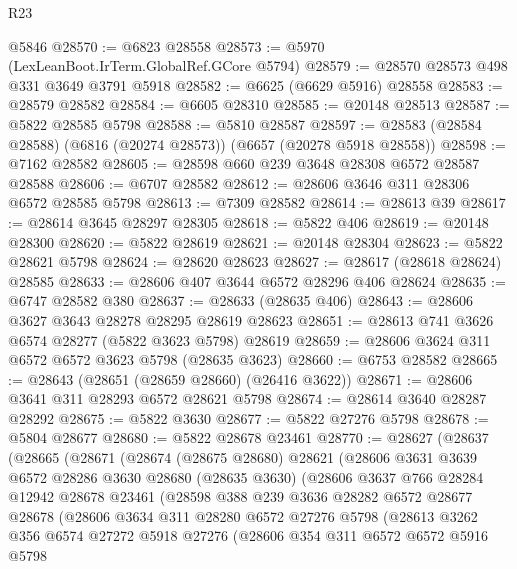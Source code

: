 \begin{lexlean}{R23}
\begin{coremodule}
    @5846
@28570 := @6823 @28558
@28573 := @5970 (LexLeanBoot.IrTerm.GlobalRef.GCore @5794)
@28579 := @28570 @28573 @498 @331 @3649 @3791 @5918
@28582 := @6625 (@6629 @5916) @28558
@28583 := @28579 @28582
@28584 := @6605 @28310
@28585 := @20148 @28513
@28587 := @5822 @28585 @5798
@28588 := @5810 @28587
@28597 := @28583 (@28584 @28588) (@6816 (@20274 @28573)) (@6657 (@20278 @5918 @28558))
@28598 := @7162 @28582
@28605 := @28598 @660 @239 @3648 @28308 @6572 @28587 @28588
@28606 := @6707 @28582
@28612 := @28606 @3646 @311 @28306 @6572 @28585 @5798
@28613 := @7309 @28582
@28614 := @28613 @39
@28617 := @28614 @3645 @28297 @28305
@28618 := @5822 @406
@28619 := @20148 @28300
@28620 := @5822 @28619
@28621 := @20148 @28304
@28623 := @5822 @28621 @5798
@28624 := @28620 @28623
@28627 := @28617 (@28618 @28624) @28585
@28633 := @28606 @407 @3644 @6572 @28296 @406 @28624
@28635 := @6747 @28582 @380
@28637 := @28633 (@28635 @406)
@28643 := @28606 @3627 @3643 @28278 @28295 @28619 @28623
@28651 := @28613 @741 @3626 @6574 @28277 (@5822 @3623 @5798) @28619
@28659 := @28606 @3624 @311 @6572 @6572 @3623 @5798 (@28635 @3623)
@28660 := @6753 @28582
@28665 := @28643 (@28651 (@28659 @28660) (@26416 @3622))
@28671 := @28606 @3641 @311 @28293 @6572 @28621 @5798
@28674 := @28614 @3640 @28287 @28292
@28675 := @5822 @3630
@28677 := @5822 @27276 @5798
@28678 := @5804 @28677
@28680 := @5822 @28678 @23461
@28770 := @28627
    (@28637
      (@28665
        (@28671
          (@28674
            (@28675 @28680)
            @28621
            (@28606
              @3631
              @3639
              @6572
              @28286
              @3630
              @28680
              (@28635 @3630)
              (@28606
                @3637
                @766
                @28284
                @12942
                @28678
                @23461
                (@28598
                  @388
                  @239
                  @3636
                  @28282
                  @6572
                  @28677
                  @28678
                  (@28606
                    @3634
                    @311
                    @28280
                    @6572
                    @27276
                    @5798
                    (@28613
                      @3262
                      @356
                      @6574
                      @27272
                      @5918
                      @27276
                      (@28606
                        @354
                        @311
                        @6572
                        @6572
                        @5916
                        @5798

\end{coremodule}
\end{lexlean}
